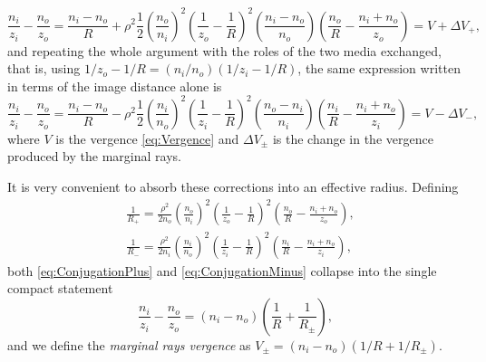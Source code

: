                     \begin{equation}\label{eq:ConjugationPlus}
                        \frac{n_i}{z_i} - \frac{n_o}{z_o} = \frac{n_i-n_o}{R} + \rho^2\frac{1}{2}\left( \frac{n_o}{n_i} \right)^2\left( \frac{1}{z_o}-\frac{1}{R} \right)^2\left( \frac{n_i-n_o}{n_o} \right)\left( \frac{n_o}{R}-\frac{n_i+n_o}{z_o} \right) = V + \Delta V_+,
                    \end{equation}
                    and repeating the whole argument with the roles of the two media exchanged, that is, using $1/z_o - 1/R = \left(n_i/n_o\right)\left( 1/z_i-1/R \right)$, the same expression written in terms of the image distance alone is
                    \begin{equation}\label{eq:ConjugationMinus}
                        \frac{n_i}{z_i} - \frac{n_o}{z_o} = \frac{n_i-n_o}{R} - \rho^2\frac{1}{2}\left( \frac{n_i}{n_o} \right)^2\left( \frac{1}{z_i}-\frac{1}{R} \right)^2\left( \frac{n_o-n_i}{n_i} \right)\left( \frac{n_i}{R}-\frac{n_i+n_o}{z_i} \right) = V - \Delta V_-,
                    \end{equation}
                    where $V$ is the vergence \ref{eq:Vergence} and $\Delta V_\pm$ is the change in the vergence produced by the marginal rays.

                    It is very convenient to absorb these corrections into an effective radius. Defining
                    \begin{align}
                        & \frac{1}{R_+} = \frac{\rho^2}{2n_o}\left( \frac{n_o}{n_i} \right)^2\left( \frac{1}{z_o} - \frac{1}{R} \right)^2\left( \frac{n_o}{R} - \frac{n_i+n_o}{z_o} \right),\label{eq:Rplus}\\
                        & \frac{1}{R_-} = \frac{\rho^2}{2n_i}\left( \frac{n_i}{n_o} \right)^2\left( \frac{1}{z_i} - \frac{1}{R} \right)^2\left( \frac{n_i}{R} - \frac{n_i+n_o}{z_i} \right),\label{eq:Rminus}
                    \end{align}
                    both \ref{eq:ConjugationPlus} and \ref{eq:ConjugationMinus} collapse into the single compact statement
                    \begin{equation}\label{eq:MarginalConjugation}
                        \frac{n_i}{z_i} - \frac{n_o}{z_o} = \left( n_i-n_o \right)\left( \frac{1}{R} + \frac{1}{R_\pm} \right),
                    \end{equation}
                    and we define the \emph{marginal rays vergence} as $V_\pm = \left(n_i-n_o\right)\left( 1/R + 1/R_\pm \right)$.

